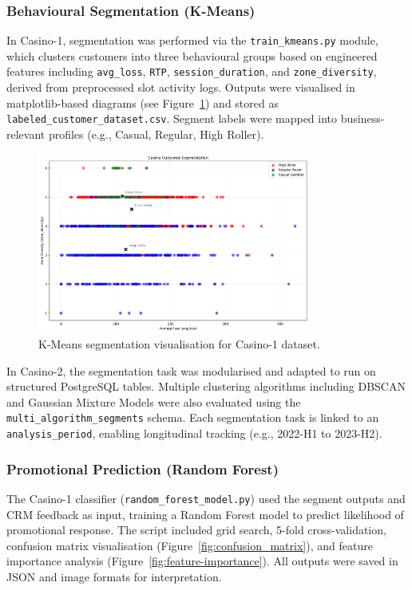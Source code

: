 \documentclass[12pt,a4paper]{report}
\begin{document}
\subsubsection*{Behavioural Segmentation (K-Means)}

In Casino-1, segmentation was performed via the \texttt{train\_kmeans.py} module, which clusters customers into three behavioural groups based on engineered features including \texttt{avg\_loss}, \texttt{RTP}, \texttt{session\_duration}, and \texttt{zone\_diversity}, derived from preprocessed slot activity logs. Outputs were visualised in matplotlib-based diagrams (see Figure~\ref{fig:casino1_segmentation}) and stored as \texttt{labeled\_customer\_dataset.csv}. Segment labels were mapped into business-relevant profiles (e.g., Casual, Regular, High Roller).

\begin{figure}[H]
\centering
\includegraphics[width=0.8\textwidth]{figures/segmentation_analysis.png}
\caption{K-Means segmentation visualisation for Casino-1 dataset.}
\label{fig:casino1_segmentation}
\end{figure}

In Casino-2, the segmentation task was modularised and adapted to run on structured PostgreSQL tables. Multiple clustering algorithms including DBSCAN and Gaussian Mixture Models were also evaluated using the \texttt{multi\_algorithm\_segments} schema. Each segmentation task is linked to an \texttt{analysis\_period}, enabling longitudinal tracking (e.g., 2022-H1 to 2023-H2).

\subsubsection*{Promotional Prediction (Random Forest)}

The Casino-1 classifier (\texttt{random\_forest\_model.py}) used the segment outputs and CRM feedback as input, training a Random Forest model to predict likelihood of promotional response. The script included grid search, 5-fold cross-validation, confusion matrix visualisation (Figure~\ref{fig:confusion_matrix}), and feature importance analysis (Figure~\ref{fig:feature-importance}). All outputs were saved in JSON and image formats for interpretation.
\end{document}

